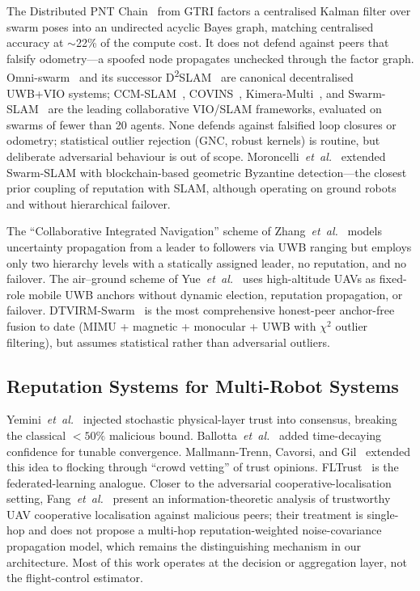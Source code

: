 \documentclass[conference,10pt]{IEEEtran}
\begin{document}
The Distributed PNT Chain~\cite{shapero2023distributed} from GTRI factors a centralised Kalman filter over swarm poses into an undirected acyclic Bayes graph, matching centralised accuracy at $\sim$22\% of the compute cost. It does not defend against peers that falsify odometry---a spoofed node propagates unchecked through the factor graph. Omni-swarm~\cite{xu2022omniswarm} and its successor D\textsuperscript{2}SLAM~\cite{xu2022d2slam} are canonical decentralised UWB+VIO systems; CCM-SLAM~\cite{schmuck2019ccmslam}, COVINS~\cite{schmuck2023covinsg}, Kimera-Multi~\cite{tian2022kimera}, and Swarm-SLAM~\cite{lajoie2024swarmslam} are the leading collaborative VIO/SLAM frameworks, evaluated on swarms of fewer than 20 agents. None defends against falsified loop closures or odometry; statistical outlier rejection (GNC, robust kernels) is routine, but deliberate adversarial behaviour is out of scope. Moroncelli~\emph{et~al.}~\cite{moroncelli2024byzantine} extended Swarm-SLAM with blockchain-based geometric Byzantine detection---the closest prior coupling of reputation with SLAM, although operating on ground robots and without hierarchical failover.

The ``Collaborative Integrated Navigation'' scheme of Zhang~\emph{et~al.}~\cite{zhang2025collaborative} models uncertainty propagation from a leader to followers via UWB ranging but employs only two hierarchy levels with a statically assigned leader, no reputation, and no failover. The air--ground scheme of Yue~\emph{et~al.}~\cite{yue2025airground} uses high-altitude UAVs as fixed-role mobile UWB anchors without dynamic election, reputation propagation, or failover. DTVIRM-Swarm~\cite{dtvirm2026} is the most comprehensive honest-peer anchor-free fusion to date (MIMU + magnetic + monocular + UWB with $\chi^2$ outlier filtering), but assumes statistical rather than adversarial outliers.

\subsection{Reputation Systems for Multi-Robot Systems}

Yemini~\emph{et~al.}~\cite{yemini2022characterizing} injected stochastic physical-layer trust into consensus, breaking the classical $<\!50\%$ malicious bound. Ballotta~\emph{et~al.}~\cite{ballotta2025confidence} added time-decaying confidence for tunable convergence. Mallmann-Trenn, Cavorsi, and Gil~\cite{mallmanntrenn2022crowd} extended this idea to flocking through ``crowd vetting'' of trust opinions. FLTrust~\cite{cao2021fltrust} is the federated-learning analogue. Closer to the adversarial cooperative-localisation setting, Fang~\emph{et~al.}~\cite{fang2024trustworthy} present an information-theoretic analysis of trustworthy UAV cooperative localisation against malicious peers; their treatment is single-hop and does not propose a multi-hop reputation-weighted noise-covariance propagation model, which remains the distinguishing mechanism in our architecture. Most of this work operates at the decision or aggregation layer, not the flight-control estimator.
\end{document}
